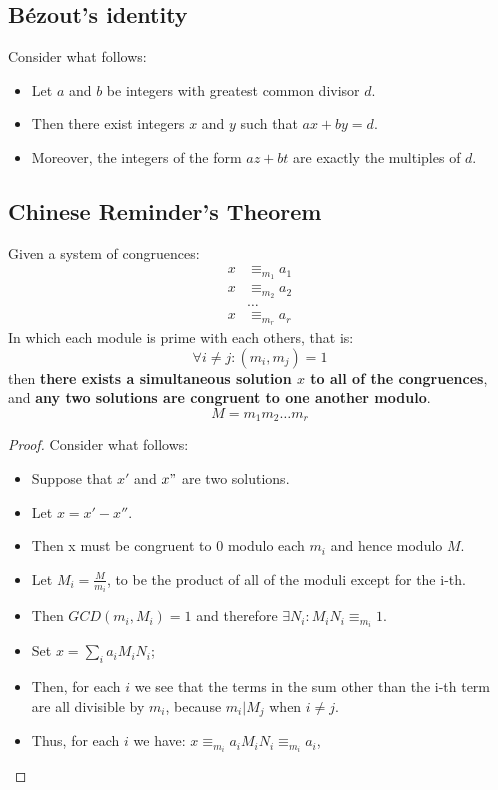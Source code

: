 \subsection{Bézout's identity}
\begin{theorem}
    Consider what follows:
    \begin{itemize}
        \item Let $a$ and $b$ be integers with greatest common divisor $d$.
        \item Then there exist integers $x$ and $y$ such that $ax + by = d$.
        \item Moreover, the integers of the form $az + bt$ are exactly the multiples of $d$.
    \end{itemize}
\end{theorem}

\subsection{Chinese Reminder's Theorem}
\begin{theorem}
    Given a system of congruences:
    \begin{align*}
        x & \equiv_{m_{1}} a_{1} \\
        x & \equiv_{m_{2}} a_{2} \\
        &\dots \\
        x & \equiv_{m_{r}} a_{r}
    \end{align*}
    In which each module is prime with each others, that is:
    \[
    \forall i \neq j: (m_{i}, m_{j}) = 1
    \]
    then \textbf{there exists a simultaneous solution $x$ to all of the congruences}, and \textbf{any two solutions are congruent to one another modulo}.
    \[M = m_{1}m_{2}\dots m_{r}\]
\end{theorem}

\begin{proof}
    Consider what follows:
    \begin{itemize}
        \item Suppose that $x'$ and $x"$ are two solutions.
        \item Let $x = x' - x''$.
        \item Then x must be congruent to $0$ modulo each $m_{i}$ and hence modulo $M$.
        \item Let $M_{i} = \frac{M}{m_{i}}$, to be the product of all of the moduli except for the i-th.
        \item Then $GCD(m_{i}, M_{i}) = 1$ and therefore $\exists N_{i}: M_{i}N_{i} \equiv_{m_{i}} 1$.
        \item Set $x = \sum_{i}a_{i}M_{i}N_{i}$;
        \item Then, for each $i$ we see that the terms in the sum other than the i-th term are all divisible by $m_{i}$, because $m_{i} | M_{j}$ when $i \neq j$.
        \item Thus, for each $i$ we have: $x \equiv_{m_{i}} a_{i}M_{i}N_{i} \equiv_{m_{i}} a_{i}$,
    \end{itemize}
\end{proof}

